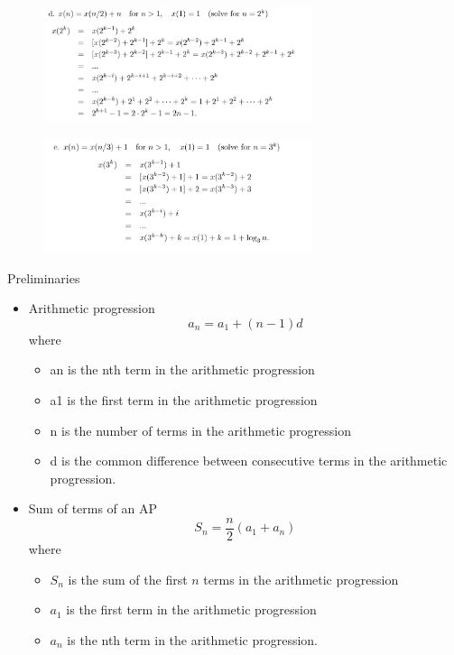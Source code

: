 \documentclass{article}
\begin{document}
\begin{enumerate}
\begin{figure}[!ht]
        \includegraphics*[width=0.7\textwidth]{rec4.png}
    \end{figure}
    \begin{figure}[!ht]
        \centering
        \includegraphics*[width=0.7\textwidth]{rec5.png}
    \end{figure}


\pagebreak

Preliminaries

\begin{itemize}
    \item Arithmetic progression 
    \begin{equation*}
        a_n = a_1 + (n - 1)d
    \end{equation*}
    where
    \begin{itemize}
        \item an is the nth term in the arithmetic progression
        \item a1 is the first term in the arithmetic progression
        \item n is the number of terms in the arithmetic progression
        \item d is the common difference between consecutive terms in the arithmetic progression.
    \end{itemize}
    
    \item Sum of terms of an AP
    \begin{equation*}
        S_n = \frac{n}{2}(a_1 + a_n)
    \end{equation*}
    where
    \begin{itemize}
        \item $S_n$ is the sum of the first $n$ terms in the arithmetic progression
        \item $a_1$ is the first term in the arithmetic progression
        \item $a_n$ is the nth term in the arithmetic progression.    
    \end{itemize}


\end{itemize}
\end{enumerate}
\end{document}

